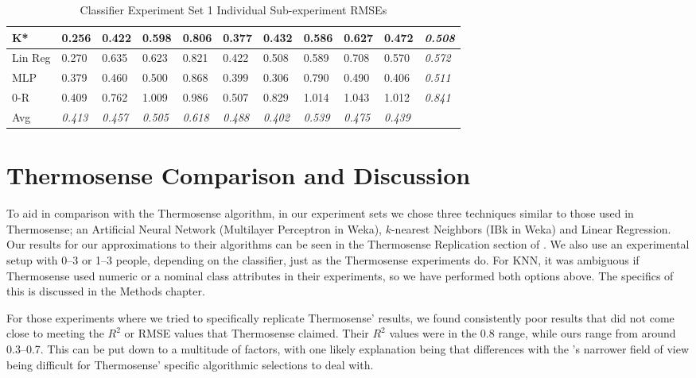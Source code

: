 \documentclass[../thesis/thesis.tex]{subfiles}
\begin{document}
\begin{landscape}
\begin{table}
\begin{tabular}{|l|l|l|l|l|l|l|l|l|l|l|}
K*      & 0.256          & 0.422          & 0.598          & 0.806          & 0.377          & 0.432          & 0.586          & 0.627          & 0.472          & \textit{0.508} \\ \hline
Lin Reg & 0.270          & 0.635          & 0.623          & 0.821          & 0.422          & 0.508          & 0.589          & 0.708          & 0.570          & \textit{0.572} \\ \hline
MLP     & 0.379          & 0.460          & 0.500          & 0.868          & 0.399          & 0.306          & 0.790          & 0.490          & 0.406          & \textit{0.511} \\ \hline
0-R     & 0.409          & 0.762          & 1.009          & 0.986          & 0.507          & 0.829          & 1.014          & 1.043          & 1.012          & \textit{0.841} \\ \hline
Avg     & \textit{0.413} & \textit{0.457} & \textit{0.505} & \textit{0.618} & \textit{0.488} & \textit{0.402} & \textit{0.539} & \textit{0.475} & \textit{0.439} &                \\ \hline
\end{tabular}
\caption{Classifier Experiment Set 1 Individual Sub-experiment RMSEs}
\label{tab:results:set1rmse}
\end{table}
\end{landscape}

\section{Thermosense Comparison and Discussion}

To aid in comparison with the Thermosense algorithm, in our experiment sets we chose three techniques similar to those used in Thermosense; an Artificial Neural Network (Multilayer Perceptron in Weka), $k$-nearest Neighbors (IBk in Weka) and Linear Regression. Our results for our approximations to their algorithms can be seen in the Thermosense Replication section of . We also use an experimental setup with 0--3 or 1--3 people, depending on the classifier, just as the Thermosense experiments do. For KNN, it was ambiguous if Thermosense used numeric or a nominal class attributes in their experiments, so we have performed both options above. The specifics of this is discussed in the Methods chapter.

For those experiments where we tried to specifically replicate Thermosense' results, we found consistently poor results that did not come close to meeting the $R^2$ or RMSE values that Thermosense claimed. Their $R^2$ values were in the 0.8 range, while ours range from around 0.3--0.7. This can be put down to a multitude of factors, with one likely explanation being that differences with the \mlx's narrower field of view being difficult for Thermosense' specific algorithmic selections to deal with.
\end{document}
